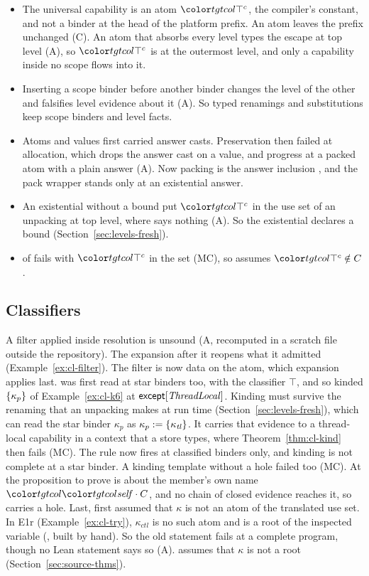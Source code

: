\begin{itemize}
\item The universal capability is an atom $\topc$, the compiler's constant, and not a binder at the head of the platform prefix. An atom leaves the prefix unchanged (C). An atom that absorbs every level types the escape at top level (A), so $\topc$ is at the outermost level, and only a capability inside no scope flows into it.
\item Inserting a scope binder before another binder changes the level of the other and falsifies level evidence about it (A). So typed renamings and substitutions keep scope binders and level facts.
\item Atoms and values first carried answer casts. Preservation then failed at allocation, which drops the answer cast on a value, and progress at a packed atom with a plain answer (A). Now packing is the answer inclusion , and the pack wrapper stands only at an existential answer.
\item An existential without a bound put $\topc$ in the use set of an unpacking at top level, where  says nothing (A). So the existential declares a bound (Section~\ref{sec:levels-fresh}).
\item {} of \treeK fails with $\topc$ in the set (MC), so \treeCC assumes $\topc \notin C$.
\end{itemize}

\subsection{Classifiers}

A filter applied inside resolution is unsound (A, recomputed in a scratch file outside the repository). The expansion after it reopens what it admitted (Example~\ref{ex:cl-filter}). The filter is now data on the atom, which expansion applies last.  was first read at star binders too, with the classifier $\top$, and so kinded $\{\kappa_p\}$ of Example~\ref{ex:cl-k6} at $\mathsf{except}[\mathit{ThreadLocal}]$. Kinding must survive the renaming that an unpacking makes at run time (Section~\ref{sec:levels-fresh}), which can read the star binder $\kappa_p$ as $\kappa_p \mathrel{:=}\{\kappa_{\mathit{tl}}\}$. It carries that evidence to a thread-local capability in a context that a store types, where Theorem~\ref{thm:cl-kind} then fails (MC). The rule now fires at classified binders only, and kinding is not complete at a star binder. A kinding template without a hole failed too (MC). At  the proposition to prove is about the member's own name $\sel{\self}{C}$, and no chain of closed evidence reaches it, so  carries a hole. Last,  first assumed that $\kappa$ is not an atom of the translated use set. In E1r (Example~\ref{ex:cl-try}), $\kappa_{\mathit{ctl}}$ is no such atom and is a root of the inspected variable (, built by hand). So the old statement fails at a complete program, though no Lean statement says so (A). \treeCL assumes that $\kappa$ is not a root (Section~\ref{sec:source-thms}).

